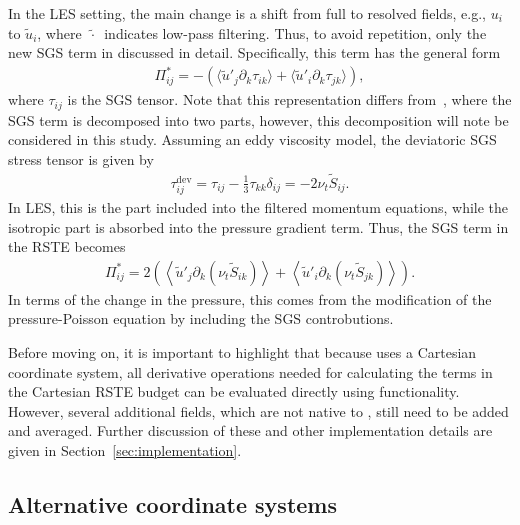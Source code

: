 In the LES setting, the main change is a shift from full to resolved fields, e.g., $u_i$ to $\tilde{u}_i$, where $\tilde{\, \cdot \,}$ indicates low-pass filtering.
Thus, to avoid repetition, only the new SGS term in discussed in detail.
Specifically, this term has the general form
\begin{align}
    \Pi_{ij}^* 
    =
    -  \left( \langle \tilde{u}'_j \partial_k \tau_{ik} \rangle
    + \langle \tilde{u}'_i \partial_k \tau_{jk} \rangle \right),
\end{align}
where $\tau_{ij}$ is the SGS tensor.
Note that this representation differs from~\cite{meneveau1994statistics}, where the SGS term is decomposed into two parts, however, this decomposition will note be considered in this study.
Assuming an eddy viscosity model, the deviatoric SGS stress tensor is given by 
\begin{align}
    \tau_{ij}^\text{dev}
    =
    \tau_{ij} - \frac{1}{3} \tau_{kk} \delta_{ij}  
    =
    - 2 \nu_t \tilde{S}_{ij}.
\end{align}
In LES, this is the part included into the filtered momentum equations, while the isotropic part is absorbed into the pressure gradient term.
Thus, the SGS term in the RSTE becomes
\begin{align}
    \Pi_{ij}^*
    =
    2 \left( \left\langle \tilde{u}'_j \partial_k (\nu_t \tilde{S}_{ik}) \right\rangle + \left\langle \tilde{u}'_i \partial_k (\nu_t \tilde{S}_{jk}) \right\rangle \right) .
\end{align}
In terms of the change in the pressure, this comes from the modification of the pressure-Poisson equation by including the SGS controbutions.

Before moving on, it is important to highlight that because \OF uses a Cartesian coordinate system, all derivative operations needed for calculating the terms in the Cartesian RSTE budget can be evaluated directly using \OF functionality.
However, several additional fields, which are not native to \OF, still need to be added and averaged.
Further discussion of these and other implementation details are given in Section~\ref{sec:implementation}.

\subsection{Alternative coordinate systems}
\label{subsec:alternative_coordinate_systems}

